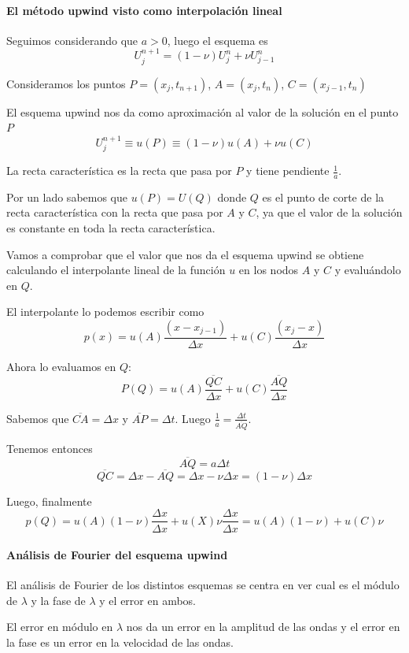 \paragraph{El método upwind visto como interpolación lineal}
Seguimos considerando que $a > 0$, luego el esquema es 
$$U_j^{n+1} = (1-\nu) U_j^n+\nu U_{j-1}^n$$

Consideramos los puntos $P = (x_j, t_{n+1})$, $A = (x_j, t_n)$, $C = (x_{j-1}, t_n)$

El esquema upwind nos da como aproximación al valor de la solución en el punto $P$
$$U_j^{n+1} \equiv u(P) \equiv (1-\nu)u(A)  + \nu u(C)$$

La recta característica es la recta que pasa por $P$ y tiene pendiente $\frac{1}{a}$.

Por un lado sabemos que $u(P) = U(Q)$ donde $Q$ es el punto de corte de la recta característica con la recta que pasa por $A$ y $C$, ya que el valor de la solución es constante en toda la recta característica.

Vamos a comprobar que el valor que nos da el esquema upwind se obtiene calculando el interpolante lineal de la función $u$ en los nodos $A$ y $C$ y evaluándolo en $Q$.

El interpolante lo podemos escribir como
$$p(x) = u(A) \frac{(x-x_{j-1})}{\Delta x}+u(C) \frac{(x_j-x)}{\Delta x}$$

Ahora lo evaluamos en $Q$:
$$P(Q) = u(A)\frac{\overline{QC}}{\Delta x} + u(C)\frac{\overline{AQ}}{\Delta x}$$

Sabemos que $\overline{CA} = \Delta x$ y $\overline{AP} = \Delta t$. Luego $\frac{1}{a} = \frac{\Delta t}{\overline{AQ}}$.

Tenemos entonces
$$\overline{AQ} = a\Delta t$$
$$\overline{QC} = \Delta x - \overline{AQ} = \Delta x -\nu\Delta x = (1-\nu)\Delta x$$

Luego, finalmente
$$p(Q) = u(A)(1-\nu)\frac{\Delta x}{\Delta x} + u(X) \nu\frac{\Delta x}{\Delta x} = u(A) (1-\nu)+u(C)\nu$$

\paragraph{Análisis de Fourier del esquema upwind}

El análisis de Fourier de los distintos esquemas se centra en ver cual es el módulo de $\lambda$ y la fase de $\lambda$ y el error en ambos.

El error en módulo en $\lambda$ nos da un error en la amplitud de las ondas y el error en la fase es un error en la velocidad de las ondas.

